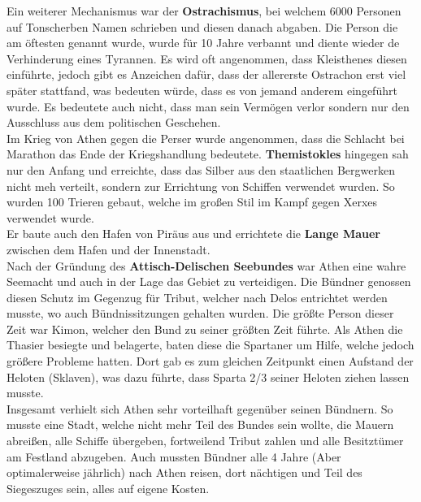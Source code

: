 \documentclass{article}
\begin{document}
	Ein weiterer Mechanismus war der \textbf{Ostrachismus}, bei welchem 6000 Personen auf Tonscherben Namen schrieben und diesen danach abgaben. Die Person die am öftesten genannt wurde, wurde für 10 Jahre verbannt und diente wieder de Verhinderung eines Tyrannen. Es wird oft angenommen, dass Kleisthenes diesen einführte, jedoch gibt es Anzeichen dafür, dass der allererste Ostrachon erst viel später stattfand, was bedeuten würde, dass es von jemand anderem eingeführt wurde. Es bedeutete auch nicht, dass man sein Vermögen verlor sondern nur den Ausschluss aus dem politischen Geschehen. \\
	Im Krieg von Athen gegen die Perser wurde angenommen, dass die Schlacht bei Marathon das Ende der Kriegshandlung bedeutete. \textbf{Themistokles} hingegen sah nur den Anfang und erreichte, dass das Silber aus den staatlichen Bergwerken nicht meh verteilt, sondern zur Errichtung von Schiffen verwendet wurden. So wurden 100 Trieren gebaut, welche im großen Stil im Kampf gegen Xerxes verwendet wurde. \\
	Er baute auch den Hafen von Piräus aus und errichtete die \textbf{Lange Mauer} zwischen dem Hafen und der Innenstadt. \\
	Nach der Gründung des \textbf{Attisch-Delischen Seebundes} war Athen eine wahre Seemacht und auch in der Lage das Gebiet zu verteidigen. Die Bündner genossen diesen Schutz im Gegenzug für Tribut, welcher nach Delos entrichtet werden musste, wo auch Bündnissitzungen gehalten wurden. Die größte Person dieser Zeit war Kimon, welcher den Bund zu seiner größten Zeit führte. Als Athen die Thasier besiegte und belagerte, baten diese die Spartaner um Hilfe, welche jedoch größere Probleme hatten. Dort gab es zum gleichen Zeitpunkt einen Aufstand der Heloten (Sklaven), was dazu führte, dass Sparta 2/3 seiner Heloten ziehen lassen musste.\\
	Insgesamt verhielt sich Athen sehr vorteilhaft gegenüber seinen Bündnern. So musste eine Stadt, welche nicht mehr Teil des Bundes sein wollte, die Mauern abreißen, alle Schiffe übergeben, fortweilend Tribut zahlen und alle Besitztümer am Festland abzugeben. Auch mussten Bündner alle 4 Jahre (Aber optimalerweise jährlich) nach Athen reisen, dort nächtigen und Teil des Siegeszuges sein, alles auf eigene Kosten.




















	
\end{document}
